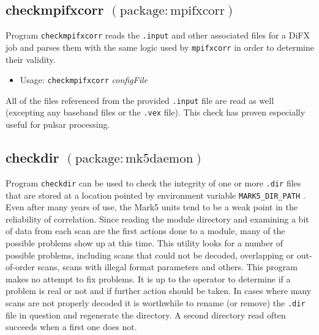\subsection{checkmpifxcorr {\small $\mathrm{(package: mpifxcorr)}$}}

Program {\tt checkmpifxcorr} reads the {\tt .input} and other associated files for a DiFX job and parses them with the same logic used by {\tt mpifxcorr} in order to determine their validity.

\begin{itemize}
\item[] Usage: {\tt checkmpifxcorr} {\em configFile}
\end{itemize}

All of the files referenced from the provided {\tt .input} file are read as well (excepting any baseband files or the {\tt .vex} file).
This check has proven especially useful for pulsar processing.






\subsection{checkdir {\small $\mathrm{(package: mk5daemon)}$}}

Program {\tt checkdir} can be used to check the integrity of one or more {\tt .dir} files that are stored at a location pointed by environment variable {\tt MARK5\_DIR\_PATH} .
Even after many years of use, the Mark5 units tend to be a weak point in the reliability of correlation.
Since reading the module directory and examining a bit of data from each scan are the first actions done to a module, many of the possible problems show up at this time.
This utility looks for a number of possible problems, including scans that could not be decoded, overlapping or out-of-order scans, scans with illegal format parameters and others.
This program makes no attempt to fix problems.
It is up to the operator to determine if a problem is real or not and if further action should be taken.
In cases where many scans are not properly decoded it is worthwhile to rename (or remove) the {\tt .dir} file in question and regenerate the directory.  
A second directory read often succeeds when a first one does not.

